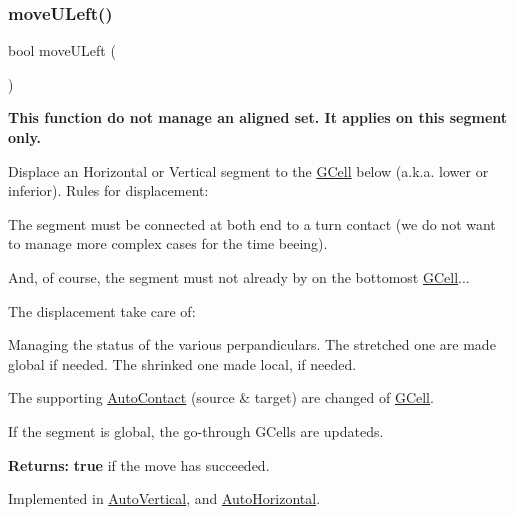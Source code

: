 \mbox{\label{classKatabatic_1_1AutoSegment_af8ca7b17e952f4b599aeeb2f4e5be395}} 
\subsubsection{\texorpdfstring{move\+U\+Left()}{moveULeft()}}
{\footnotesize\ttfamily bool move\+U\+Left (\begin{DoxyParamCaption}{ }\end{DoxyParamCaption})\hspace{0.3cm}{\ttfamily [pure virtual]}}

{\bfseries This function do not manage an aligned set. It applies on {\ttfamily this} segment only.}

Displace an Horizontal or Vertical segment to the \hyperlink{classKatabatic_1_1GCell}{G\+Cell} below (a.\+k.\+a. lower or inferior). Rules for displacement\+:
\begin{DoxyItemize}
\item The segment must be connected at both end to a turn contact (we do not want to manage more complex cases for the time beeing).
\item And, of course, the segment must not already by on the bottomost \hyperlink{classKatabatic_1_1GCell}{G\+Cell}...
\end{DoxyItemize}

The displacement take care of\+:
\begin{DoxyItemize}
\item Managing the status of the various perpandiculars. The stretched one are made global if needed. The shrinked one made local, if needed.
\item The supporting \hyperlink{classKatabatic_1_1AutoContact}{Auto\+Contact} (source \& target) are changed of \hyperlink{classKatabatic_1_1GCell}{G\+Cell}.
\item If the segment is global, the go-\/through G\+Cells are updateds.
\end{DoxyItemize}

{\bfseries Returns\+:} {\bfseries true} if the move has succeeded.

 

Implemented in \hyperlink{classKatabatic_1_1AutoVertical_a1fa2421b74bf0eb934b7002fd3da2321}{Auto\+Vertical}, and \hyperlink{classKatabatic_1_1AutoHorizontal_a1fa2421b74bf0eb934b7002fd3da2321}{Auto\+Horizontal}.

